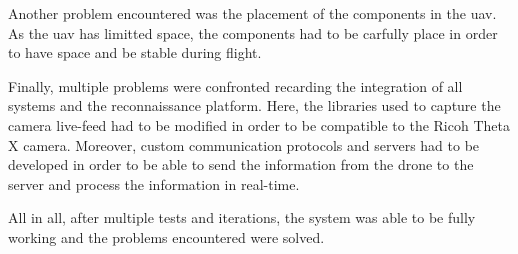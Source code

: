 Another problem encountered was the placement of the components in the \gls{uav}. As the \gls{uav} has limitted space, the components had to be carfully place in order to have space and be stable during flight.

Finally, multiple problems were confronted recarding the integration of all systems and the reconnaissance platform. Here, the libraries used to capture the camera live-feed had to be modified in order to be compatible to the Ricoh Theta X camera. Moreover, custom communication protocols and servers had to be developed in order to be able to send the information from the drone to the server and process the information in real-time.

All in all, after multiple tests and iterations, the system was able to be fully working and the problems encountered were solved.
